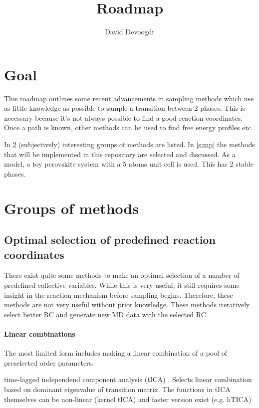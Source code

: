 \documentclass{article}
\title{Roadmap }
\author{David Devoogdt }
\date{}
\begin{document}
\maketitle

\section{Goal}
This roadmap outlines some recent advancements in sampling methods which use as little knowledge as possible to sample a transition between 2 phases. This is necessary because it's not always possible to find a good reaction coordinates. Once a path is known, other methods can be used to find free energy profiles etc.

In \cref{s:gm} (subjectively) interesting groups of methods are listed. In \cref{s:mp} the methods that will be implemented in this repository are selected and discussed. As a model, a toy perovskite system with a 5 atoms unit cell is used. This has 2 stable phases.

\section{Groups of methods}\label{s:gm}

\subsection{Optimal selection of predefined reaction coordinates}

There exist quite some methods to make an optimal selection of a number of predefined collective variables. While this is very useful, it still requires some insight in the reaction mechanism before sampling begins. Therefore, these methods are not very useful without prior knowledge. These methods iteratively select better RC and generate new MD data with the selected RC.

\paragraph{Linear combinations} The most limited form includes making a linear combination of a pool of preselected order parameters.

time-lagged independend component analysis (tICA) \cite{Tiwary2016}. Selects linear combination based on dominant eigenvalue of transition matrix. The functions in tICA themselves can be non-linear (kernel tICA) and faster version exist (e.g. hTICA)
\end{document}
